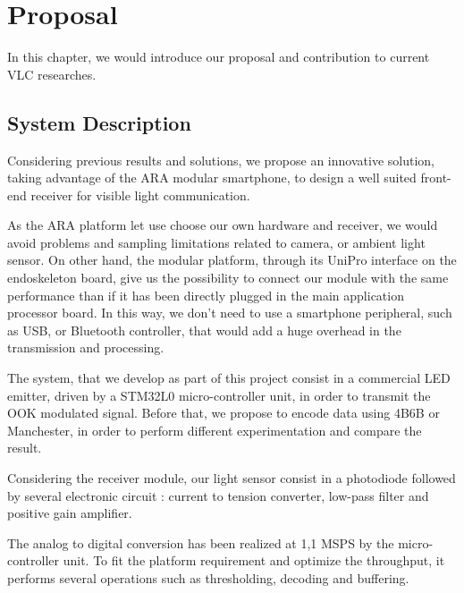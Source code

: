 
\chapter{Proposal} %

\label{Proposal} %


In this chapter, we would introduce our proposal and contribution to current VLC researches. 


\section{System Description}


Considering previous results and solutions, we propose an innovative solution, taking advantage of the ARA modular smartphone,
to design a well suited front-end receiver for visible light communication.

As the ARA platform let use choose our own hardware and receiver, we would avoid problems and sampling limitations related to camera, or ambient light sensor.
On other hand, the modular platform, through its UniPro interface on the endoskeleton board, give us the possibility to connect our module with the same performance than if it has been directly plugged in the main application processor board.
In this way, we don't need to use a smartphone peripheral, such as USB, or Bluetooth controller, that would add a huge overhead in the transmission and processing.

The system, that we develop as part of this project consist in a commercial LED emitter, driven by a STM32L0 micro-controller unit, in order to transmit the OOK modulated signal. Before that, we propose to encode data using 4B6B or Manchester, in order to perform different experimentation and compare the result.

Considering the receiver module, our light sensor consist in a photodiode followed by several electronic circuit : current to tension converter, low-pass filter and positive gain amplifier.

The analog to digital conversion has been realized at 1,1 MSPS by the micro-controller unit. To fit the platform requirement and optimize the throughput, it performs several operations such as thresholding, decoding and buffering.

